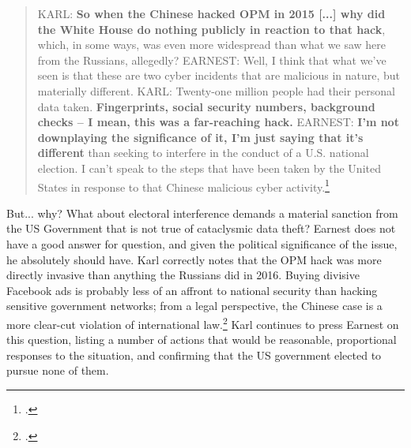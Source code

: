 \documentclass{memoir}
\begin{document}
\begin{refsegment}
\begin{quote}
KARL: \textbf{So when the Chinese hacked OPM in 2015 [...] why did the White House do nothing publicly in reaction to that hack}, which, in some ways, was even more widespread than what we saw here from the Russians, allegedly?
\newline \newline
EARNEST: Well, I think that what we've seen is that these are two cyber incidents that are malicious in nature, but materially different.
\newline \newline
KARL: Twenty-one million people had their personal data taken.  \textbf{Fingerprints, social security numbers, background checks -- I mean, this was a far-reaching hack.}
\newline \newline
EARNEST: \textbf{I'm not downplaying the significance of it, I'm just saying that it's different} than seeking to interfere in the conduct of a U.S. national election. I can't speak to the steps that have been taken by the United States in response to that Chinese malicious cyber activity.\footcite[Transcript adapted from the official White House website.]{earnest_press_2017}
\end{quote}

But... why? What about electoral interference demands a material sanction from the US Government that is not true of cataclysmic data theft? Earnest does not have a good answer for question, and given the political significance of the issue, he absolutely should have. Karl correctly notes that the OPM hack was more directly invasive than anything the Russians did in 2016. Buying divisive Facebook ads is probably less of an affront to national security than hacking sensitive government networks; from a legal perspective, the Chinese case is a more clear-cut violation of international law.\footcite[p.~625]{terry_dont_2018} Karl continues to press Earnest on this question, listing a number of actions that would be reasonable, proportional responses to the situation, and confirming that the US government elected to pursue none of them.


\end{refsegment}
\end{document}
